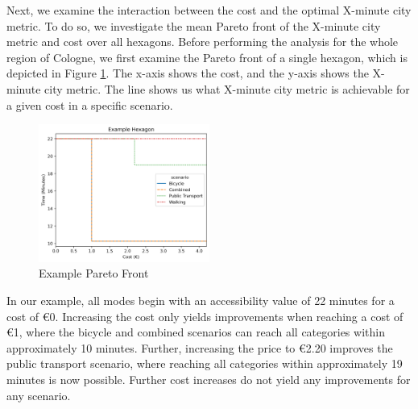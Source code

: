 Next, we examine the interaction between the cost and the optimal X-minute city metric.
To do so, we investigate the mean Pareto front of the X-minute city metric and cost over all hexagons.
Before performing the analysis for the whole region of Cologne, we first examine the Pareto front of a single hexagon, which is depicted in Figure \ref{fig:example_pareto_front}.
The x-axis shows the cost, and the y-axis shows the X-minute city metric.
The line shows us what X-minute city metric is achievable for a given cost in a specific scenario.

\begin{figure}
  \begin{center}
     \includegraphics[width=0.5\textwidth]{Figures/results/metric_cost/example_profile}
  \end{center}
  \caption{Example Pareto Front}
  \label{fig:example_pareto_front}
\end{figure}

In our example, all modes begin with an accessibility value of 22 minutes for a cost of \euro{0}.
Increasing the cost only yields improvements when reaching a cost of \euro{1}, where the bicycle and combined scenarios can reach all categories within approximately 10 minutes.
Further, increasing the price to \euro{2.20} improves the public transport scenario, where reaching all categories within approximately 19 minutes is now possible.
Further cost increases do not yield any improvements for any scenario.

